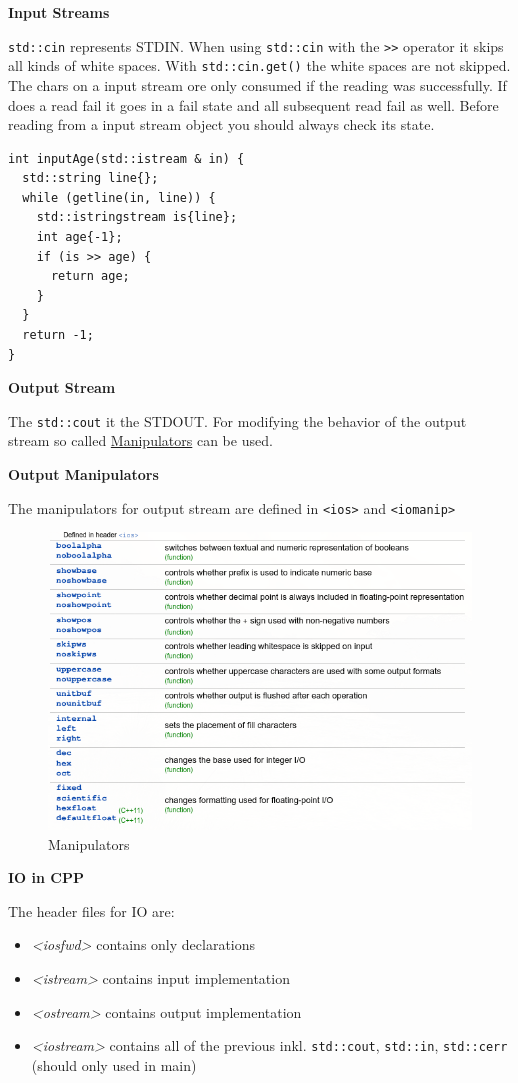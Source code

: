 \documentclass[11pt,twoside,landscape]{article}
\begin{document}
\begin{multicols}{3}
\textbf{Input Streams}

\texttt{std::cin} represents STDIN.
When using \texttt{std::cin} with the \texttt{>>} operator it skips all kinds of white spaces.
With \texttt{std::cin.get()} the white spaces are not skipped.
The chars on a input stream ore only consumed if the reading was successfully.
If does a read fail it goes in a fail state and all subsequent read fail as well.
Before reading from a input stream object you should always check its state.


\lstset{language=c++,label= ,caption= ,captionpos=b,numbers=none}
\begin{lstlisting}
int inputAge(std::istream & in) {
  std::string line{};
  while (getline(in, line)) {
    std::istringstream is{line};
    int age{-1};
    if (is >> age) {
      return age;
    }
  }
  return -1;
}
\end{lstlisting}

\textbf{Output Stream}

The \texttt{std::cout} it the STDOUT.
For modifying the behavior of the output stream so called \href{../../../roam/20211008115905-manipulators_in_cpp.org}{Manipulators} can be used.

\textbf{Output Manipulators}

The manipulators for output stream are defined in \texttt{<ios>} and \texttt{<iomanip>}
\begin{figure}[htbp]
\centering
\includegraphics[width=.9\linewidth]{img/manipulator.png}
\caption{Manipulators}
\end{figure}

\textbf{IO in CPP}

The header files for IO are:
\begin{itemize}
\item \emph{<iosfwd>} contains only declarations
\item \emph{<istream>} contains input implementation
\item \emph{<ostream>} contains output implementation
\item \emph{<iostream>} contains all of the previous inkl. \texttt{std::cout}, \texttt{std::in}, \texttt{std::cerr} (should only used in main)
\end{itemize}



\end{multicols}
\end{document}
